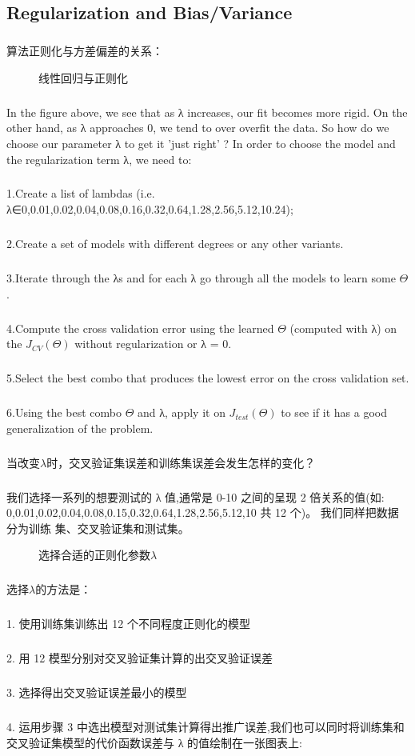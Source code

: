 \documentclass{article}
\begin{document}
\begin{CJK}{UTF8}{gbsn}
\subsection{Regularization and Bias/Variance}
\subparagraph{}
算法正则化与方差偏差的关系：
\begin{figure}[H]
\label{fig:627}
\caption{线性回归与正则化}
\end{figure}
\begin{figure}[H]
\label{fig:628}
\end{figure}
\subparagraph{}
In the figure above, we see that as λ increases, our fit becomes more rigid. On the other hand, as λ approaches 0, we tend to over overfit the data. So how do we choose our parameter λ to get it 'just right' ? In order to choose the model and the regularization term λ, we need to:
\subparagraph{}
1.Create a list of lambdas (i.e. λ∈{0,0.01,0.02,0.04,0.08,0.16,0.32,0.64,1.28,2.56,5.12,10.24});
\subparagraph{}
2.Create a set of models with different degrees or any other variants.
\subparagraph{}
3.Iterate through the λs and for each λ go through all the models to learn some $\Theta$.
\subparagraph{}
4.Compute the cross validation error using the learned $\Theta$ (computed with λ) on the $J_{CV}(\Theta)$ without regularization or λ = 0.
\subparagraph{}
5.Select the best combo that produces the lowest error on the cross validation set.
\subparagraph{}
6.Using the best combo $\Theta$ and λ, apply it on $J_{test}(\Theta)$ to see if it has a good generalization of the problem.
\subparagraph{}
当改变$\lambda$时，交叉验证集误差和训练集误差会发生怎样的变化？
\subparagraph{}
我们选择一系列的想要测试的 λ 值,通常是 0-10 之间的呈现 2 倍关系的值(如:
0,0.01,0.02,0.04,0.08,0.15,0.32,0.64,1.28,2.56,5.12,10 共 12 个)。 我们同样把数据分为训练
集、交叉验证集和测试集。
\begin{figure}[H]
\label{fig:630}
\caption{选择合适的正则化参数$\lambda$}
\end{figure}
\subparagraph{}
选择$\lambda$的方法是：
\subparagraph{}
1. 使用训练集训练出 12 个不同程度正则化的模型
\subparagraph{}
2. 用 12 模型分别对交叉验证集计算的出交叉验证误差
\subparagraph{}
3. 选择得出交叉验证误差最小的模型
\subparagraph{}
4. 运用步骤 3 中选出模型对测试集计算得出推广误差,我们也可以同时将训练集和交叉验证集模型的代价函数误差与 λ 的值绘制在一张图表上:
\begin{figure}[H]

\end{figure}
\end{CJK}
\end{document}
